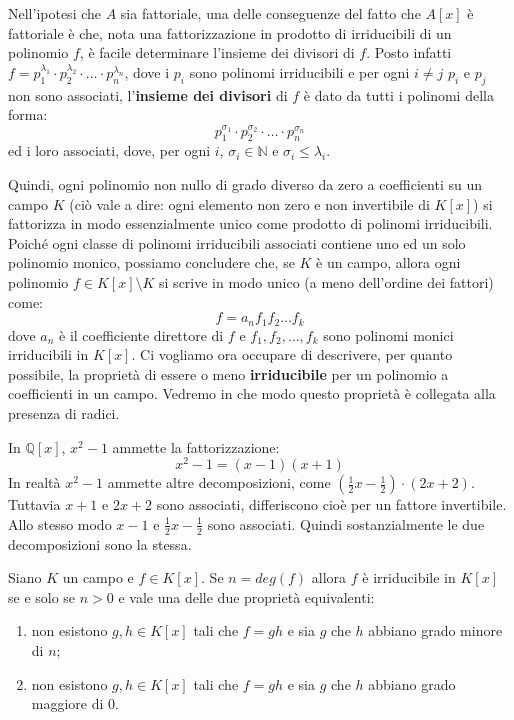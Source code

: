\begin{osservation}
	Nell’ipotesi che $A$ sia fattoriale, una delle conseguenze del fatto che $A[x]$ è fattoriale è che, nota una fattorizzazione in prodotto di irriducibili di un polinomio $f$, è facile determinare l’insieme dei divisori di $f$. Posto infatti $f=p_{1}^{\lambda_{1}} \cdot p_{2}^{\lambda_{2}} \cdot \ldots \cdot p_{n}^{\lambda_{n}}$, dove i $p_{i}$ sono polinomi irriducibili e per ogni $i \neq j$ $p_{i}$ e $p_{j}$ non sono associati, l'\textbf{insieme dei divisori} di $f$ è dato da tutti i polinomi della forma:
	\[
	p_{1}^{\sigma_{1}} \cdot p_{2}^{\sigma_{2}} \cdot \ldots \cdot p_{n}^{\sigma_{n}}
	\]
	ed i loro associati, dove, per ogni $i$, $\sigma_{i} \in \mathbb{N}$ e $\sigma_{i} \leq \lambda_{i}$.
\end{osservation}

Quindi, ogni polinomio non nullo di grado diverso da zero a coefficienti su un campo $K$ (ciò vale a dire: ogni elemento non zero e non invertibile di $K[x]$) si fattorizza in modo essenzialmente unico come prodotto di polinomi irriducibili. Poiché ogni classe di polinomi irriducibili associati contiene uno ed un solo polinomio monico, possiamo concludere che, se $K$ è un campo, allora ogni polinomio $f \in K[x]\setminus K$ si scrive in modo unico (a meno dell'ordine dei fattori) come:
\[
f= a_{n} f_{1} f_{2} \ldots f_{k}
\]
dove $a_{n}$ è il coefficiente direttore di $f$ e $f_{1},f_{2}, \ldots, f_{k}$ sono polinomi monici irriducibili in $K[x]$. Ci vogliamo ora occupare di descrivere, per quanto possibile, la proprietà di essere o meno \textbf{irriducibile} per un polinomio a coefficienti in un campo. Vedremo in che modo questo proprietà è collegata alla presenza di radici.


\begin{example}
	In $\mathbb{Q}[x]$, $x^{2}-1$ ammette la fattorizzazione:
	\begin{displaymath}
		x^{2}-1 = (x-1)(x+1)
	\end{displaymath}
	In realtà $x^{2}-1$ ammette altre decomposizioni, come $(\frac{1}{2}x-\frac{1}{2})\cdot(2x+2)$. Tuttavia $x+1$ e $2x+2$ sono associati, differiscono cioè per un fattore invertibile. Allo stesso modo $x-1$ e $\frac{1}{2}x-\frac{1}{2}$ sono associati. Quindi sostanzialmente le due decomposizioni sono la stessa.
\end{example}

\begin{propbox}
	Siano $K$ un campo e $f \in K[x]$. Se $n= deg(f)$ allora $f$ è irriducibile in $K[x]$ se e solo se $n>0$ e vale una delle due proprietà equivalenti:
	\begin{enumerate}
		\item non esistono $g,h \in K[x]$ tali che $f=gh$ e sia $g$ che $h$ abbiano grado minore di $n$;
		\item non esistono $g,h \in K[x]$ tali che $f=gh$ e sia $g$ che $h$ abbiano grado maggiore di $0$.
	\end{enumerate}
\end{propbox}

